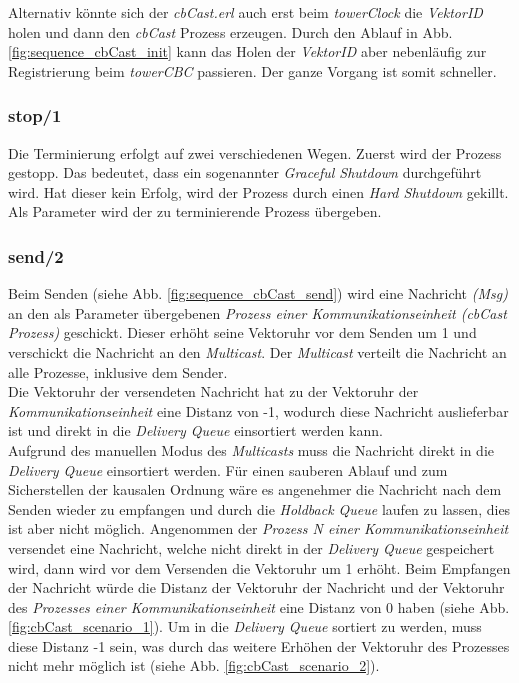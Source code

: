 Alternativ könnte sich der \textit{cbCast.erl} auch erst beim \textit{towerClock} die \textit{VektorID} holen und dann den \textit{cbCast} Prozess erzeugen. Durch den Ablauf in Abb. \ref{fig:sequence_cbCast_init} kann das Holen der \textit{VektorID} aber nebenläufig zur Registrierung beim \textit{towerCBC} passieren. Der ganze Vorgang ist somit schneller.

\subsubsection{stop/1} \label{commModule_stop}

Die Terminierung erfolgt auf zwei verschiedenen Wegen. Zuerst wird der Prozess gestopp.  Das bedeutet, dass ein sogenannter \textit{Graceful Shutdown} durchgeführt wird. Hat dieser kein Erfolg, wird der Prozess durch einen \textit{Hard Shutdown} gekillt.\\
Als Parameter wird der zu terminierende Prozess übergeben.

\subsubsection{send/2} \label{commModule_send}

Beim Senden (siehe Abb. \ref{fig:sequence_cbCast_send}) wird eine Nachricht \textit{(Msg)} an den als Parameter übergebenen \textit{Prozess einer Kommunikationseinheit (cbCast Prozess)} geschickt. Dieser erhöht seine Vektoruhr vor dem Senden um 1 und verschickt die Nachricht an den \textit{Multicast}. Der \textit{Multicast} verteilt die Nachricht an alle Prozesse, inklusive dem Sender.\\
Die Vektoruhr der versendeten Nachricht hat zu der Vektoruhr der \textit{Kommunikationseinheit} eine Distanz von -1, wodurch diese Nachricht auslieferbar ist und direkt in die \textit{Delivery Queue} einsortiert werden kann.\\
Aufgrund des manuellen Modus des \textit{Multicasts} muss die Nachricht direkt in die \textit{Delivery Queue} einsortiert werden. Für einen sauberen Ablauf und zum Sicherstellen der kausalen Ordnung wäre es angenehmer die Nachricht nach dem Senden wieder zu empfangen und durch die \textit{Holdback Queue} laufen zu lassen, dies ist aber nicht möglich. Angenommen der \textit{Prozess N einer Kommunikationseinheit} versendet eine Nachricht, welche nicht direkt in der \textit{Delivery Queue} gespeichert wird, dann wird vor dem Versenden die Vektoruhr um 1 erhöht. Beim Empfangen der Nachricht würde die Distanz der Vektoruhr der Nachricht und der Vektoruhr des \textit{Prozesses einer Kommunikationseinheit} eine Distanz von 0 haben (siehe Abb. \ref{fig:cbCast_scenario_1}). Um in die \textit{Delivery Queue} sortiert zu werden, muss diese Distanz -1 sein, was durch das weitere Erhöhen der Vektoruhr des Prozesses nicht mehr möglich ist (siehe Abb. \ref{fig:cbCast_scenario_2}).

